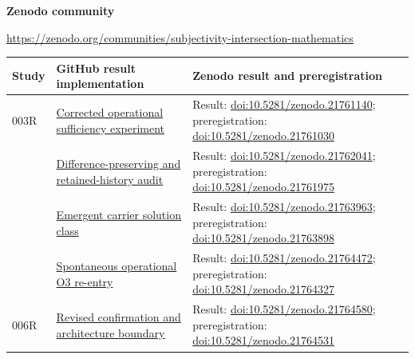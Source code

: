 \documentclass[11pt,a4paper]{article}
\begin{document}
\noindent\textbf{Zenodo community}
\begin{center}
\small\url{https://zenodo.org/communities/subjectivity-intersection-mathematics}
\end{center}

\begin{longtable}{@{}>{\raggedright\arraybackslash}p{1.2cm}>{\raggedright\arraybackslash}p{5.0cm}>{\raggedright\arraybackslash}p{7.8cm}@{}}
\toprule
Study & GitHub result implementation & Zenodo result and preregistration \\
\midrule
\endhead
003R & \href{https://github.com/SIEL-Research/Subjectivity-Intersection-Mathematics/tree/main/experiments/003r_subjectivity_agent_class2_o3_corrected}{Corrected operational sufficiency experiment} & Result: \href{https://doi.org/10.5281/zenodo.21761140}{doi:10.5281/zenodo.21761140}; preregistration: \href{https://doi.org/10.5281/zenodo.21761030}{doi:10.5281/zenodo.21761030} \\
004 & \href{https://github.com/SIEL-Research/Subjectivity-Intersection-Mathematics/tree/main/experiments/004_difference_preserving_o3_discrimination}{Difference-preserving and retained-history audit} & Result: \href{https://doi.org/10.5281/zenodo.21762041}{doi:10.5281/zenodo.21762041}; preregistration: \href{https://doi.org/10.5281/zenodo.21761975}{doi:10.5281/zenodo.21761975} \\
005 & \href{https://github.com/SIEL-Research/Subjectivity-Intersection-Mathematics/tree/main/experiments/005_emergent_relational_carrier_solution_class}{Emergent carrier solution class} & Result: \href{https://doi.org/10.5281/zenodo.21763963}{doi:10.5281/zenodo.21763963}; preregistration: \href{https://doi.org/10.5281/zenodo.21763898}{doi:10.5281/zenodo.21763898} \\
006 & \href{https://github.com/SIEL-Research/Subjectivity-Intersection-Mathematics/tree/main/experiments/006_spontaneous_o3_reentry}{Spontaneous operational O3 re-entry} & Result: \href{https://doi.org/10.5281/zenodo.21764472}{doi:10.5281/zenodo.21764472}; preregistration: \href{https://doi.org/10.5281/zenodo.21764327}{doi:10.5281/zenodo.21764327} \\
006R & \href{https://github.com/SIEL-Research/Subjectivity-Intersection-Mathematics/tree/main/experiments/006r_spontaneous_o3_reentry_revised}{Revised confirmation and architecture boundary} & Result: \href{https://doi.org/10.5281/zenodo.21764580}{doi:10.5281/zenodo.21764580}; preregistration: \href{https://doi.org/10.5281/zenodo.21764531}{doi:10.5281/zenodo.21764531} \\

\end{longtable}
\end{document}
